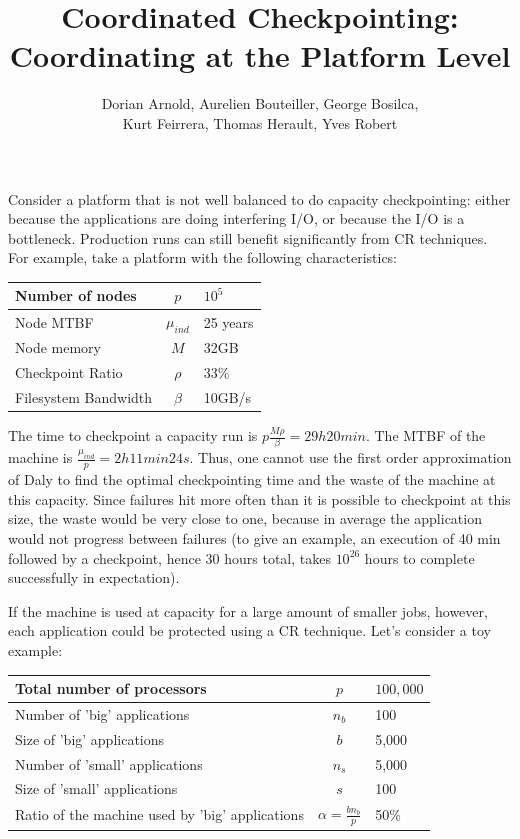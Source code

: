 \documentclass{article}
\author{Dorian Arnold, Aurelien Bouteiller, George Bosilca,\\
 Kurt Feirrera, Thomas Herault, Yves Robert}
\title{Coordinated Checkpointing: Coordinating at the Platform Level}
\begin{document}
\maketitle

Consider a platform that is not well balanced to do capacity checkpointing: either because the applications are doing interfering I/O, or because the I/O is a bottleneck. Production runs can still benefit significantly from CR techniques. For example, take a platform with the following characteristics:

\begin{center}
\begin{tabular}{l|c|l}
  Number of nodes & $p$             & $10^5$ \\\hline
  Node MTBF           & $\mu_{ind}$ & 25 years\\\hline
  Node memory      & $M$             & 32GB\\\hline
  Checkpoint Ratio & $\rho$         & 33\%\\\hline
  Filesystem Bandwidth & $\beta$ & 10GB/s\\
\end{tabular}
\end{center}

The time to checkpoint a capacity run is $p\frac{M \rho}{\beta} = 29h20min$. The MTBF of the machine is $\frac{\mu_{ind}}{p} = 2h11min24s$. Thus, one cannot use the first order approximation of Daly to find the optimal checkpointing time and the waste of the machine at this capacity. Since failures hit more often than it is possible to checkpoint at this size, the waste would be very close to one, because in average the application would not progress between failures (to give an example, an execution of 40 min
followed by a checkpoint, hence 30 hours total, takes $10^{26}$ hours to complete successfully in expectation).

If the machine is used at capacity for a large amount of smaller jobs, however, each application could be protected using a CR technique. Let's consider a toy example:

\begin{center}
\begin{tabular}{lcl}
  Total number of processors & $p$ & $100,000$\\\hline
  Number of 'big' applications & $n_{b}$ & 100\\\hline
  Size of 'big' applications & $b$ & 5,000\\\hline
  Number of 'small' applications & $n_{s}$ & 5,000\\\hline
  Size of 'small' applications & $s$ & 100\\\hline
  Ratio of the machine used by 'big' applications & $\alpha = \frac{b n_{b}}{p} $ & 50\%\\
\end{tabular}
\end{center}
\end{document}
